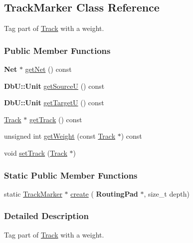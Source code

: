 \hypertarget{classKite_1_1TrackMarker}{}\subsection{Track\+Marker Class Reference}
\label{classKite_1_1TrackMarker}


Tag part of \mbox{\hyperlink{classKite_1_1Track}{Track}} with a weight.  


\subsubsection*{Public Member Functions}
\begin{DoxyCompactItemize}
\item 
\textbf{ Net} $\ast$ \mbox{\hyperlink{classKite_1_1TrackMarker_a692492374623a5c6096b2c4a51190359}{get\+Net}} () const
\item 
\textbf{ Db\+U\+::\+Unit} \mbox{\hyperlink{classKite_1_1TrackMarker_ad521ffba761b0e81b7b81b99d62f76f9}{get\+SourceU}} () const
\item 
\textbf{ Db\+U\+::\+Unit} \mbox{\hyperlink{classKite_1_1TrackMarker_a4d52a506cd19dfa8e22e1dc0695bd960}{get\+TargetU}} () const
\item 
\mbox{\hyperlink{classKite_1_1Track}{Track}} $\ast$ \mbox{\hyperlink{classKite_1_1TrackMarker_a3f34f9139b8491a0adb531ac3a904171}{get\+Track}} () const
\item 
unsigned int \mbox{\hyperlink{classKite_1_1TrackMarker_a26d951691a2c0f564a4ae842ba200ea5}{get\+Weight}} (const \mbox{\hyperlink{classKite_1_1Track}{Track}} $\ast$) const
\item 
void \mbox{\hyperlink{classKite_1_1TrackMarker_abd3d8093f871d3d1a7f24b053648026c}{set\+Track}} (\mbox{\hyperlink{classKite_1_1Track}{Track}} $\ast$)
\end{DoxyCompactItemize}
\subsubsection*{Static Public Member Functions}
\begin{DoxyCompactItemize}
\item 
static \mbox{\hyperlink{classKite_1_1TrackMarker}{Track\+Marker}} $\ast$ \mbox{\hyperlink{classKite_1_1TrackMarker_ab44a3705a23cba53cf68357de5673c04}{create}} (\textbf{ Routing\+Pad} $\ast$, size\+\_\+t depth)
\end{DoxyCompactItemize}


\subsubsection{Detailed Description}
Tag part of \mbox{\hyperlink{classKite_1_1Track}{Track}} with a weight. 

